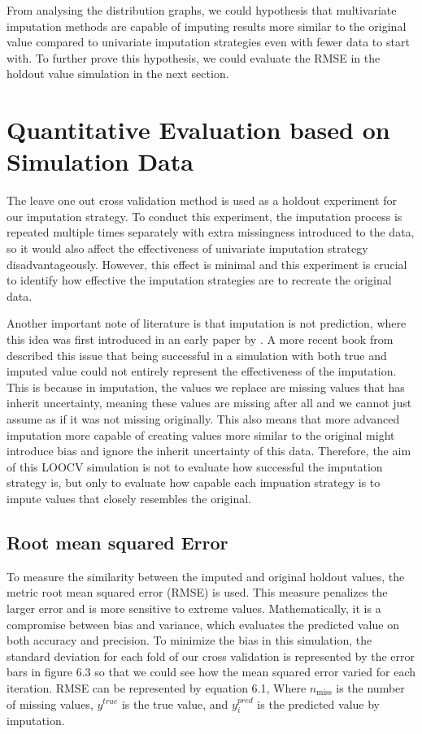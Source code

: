 \documentclass{l4proj}
\begin{document}
From analysing the distribution graphs, we could hypothesis that multivariate imputation methods are capable of imputing results more similar to the original value compared to univariate imputation strategies even with fewer data to start with. To further prove this hypothesis, we could evaluate the RMSE in the holdout value simulation in the next section.

\pagebreak


\section{Quantitative Evaluation based on Simulation Data}

The leave one out cross validation method is used as a holdout experiment for our imputation strategy. To conduct this experiment, the imputation process is repeated multiple times separately with extra missingness introduced to the data, so it would also affect the effectiveness of univariate imputation strategy disadvantageously. However, this effect is minimal and this experiment is crucial to identify how effective the imputation strategies are to recreate the original data.

Another important note of literature is that imputation is not prediction, where this idea was first introduced in an early paper by \cite{Gleason1975}. A more recent book from \cite{buuren_2021} described this issue that being successful in a simulation with both true and imputed value could not entirely represent the effectiveness of the imputation. This is because in imputation, the values we replace are missing values that has inherit uncertainty, meaning these values are missing after all and we cannot just assume as if it was not missing originally. This also means that more advanced imputation more capable of creating values more similar to the original might introduce bias and ignore the inherit uncertainty of this data. Therefore, the aim of this LOOCV simulation is not to evaluate how successful the imputation strategy is, but only to evaluate how capable each impuation strategy is to impute values that closely resembles the original.

\subsection{Root mean squared Error}
To measure the similarity between the imputed and original holdout values, the metric root mean squared error (RMSE) is used. This measure penalizes the larger error and is more sensitive to extreme values. Mathematically, it is a compromise between bias and variance, which evaluates the predicted value on both accuracy and precision. To minimize the bias in this simulation, the standard deviation for each fold of our cross validation is represented by the error bars in figure 6.3 so that we could see how the mean squared error varied for each iteration. RMSE can be represented by equation 6.1, Where \(n_\text{miss}\) is the number of missing values,  \(y^{true}\) is the true value, and \(y_i^{pred}\) is the predicted value by imputation.
\end{document}
